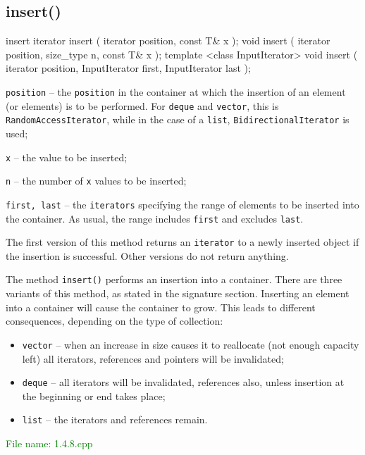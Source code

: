 
\subsection{insert()} %
\begin{methodinfo}
  {insert}
  {iterator insert ( iterator position, const T& x ); 
  void insert ( iterator position, size_type n, const T& x ); 
  template <class InputIterator> 
      void insert ( iterator position, InputIterator first, InputIterator last );}
  {\texttt{position} – the \texttt{position} in the container at which the insertion of an element 
  (or elements) is to be performed. For \texttt{deque} and \texttt{vector}, this is \texttt{RandomAccessIterator}, 
  while in the case of a \texttt{list}, \texttt{BidirectionalIterator} is used;
  
  \texttt{x} – the value to be inserted;

  \texttt{n} – the number of \texttt{x} values to be inserted;

  \texttt{first, last} – the \texttt{iterators} specifying the range of elements to be inserted into 
  the container. As usual, the range includes \texttt{first} and excludes \texttt{last}.}
  {The first version of this method returns an \texttt{iterator} to a newly inserted object 
  if the insertion is successful. Other versions do not return anything.}
  {The method \texttt{insert()} performs an insertion into a container. There are three variants of 
  this method, as stated in the signature section. Inserting an element into a container will cause 
  the container to grow. This leads to different consequences, depending on the type of collection:
  \begin{itemize}
    \item \texttt{vector} – when an increase in size causes it to reallocate (not enough capacity left) 
      all iterators, references and pointers will be invalidated;
    \item \texttt{deque} – all iterators will be invalidated, references also, unless insertion at the beginning 
      or end takes place;
    \item \texttt{list} – the iterators and references remain.
  \end{itemize}}
\end{methodinfo}

\textcolor{green}{File name: 1.4.8.cpp}

